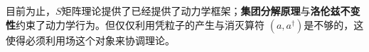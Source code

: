 \color{blue}
目前为止，$S$矩阵理论提供了已经提供了动力学框架；\textbf{集团分解原理}与\textbf{洛伦兹不变性}约束了动力学行为。但仅仅利用凭粒子的产生与消灭算符 $(a, a^\dagger)$是不够的，这使得必须利用场这个对象来协调理论。
\normalcolor



